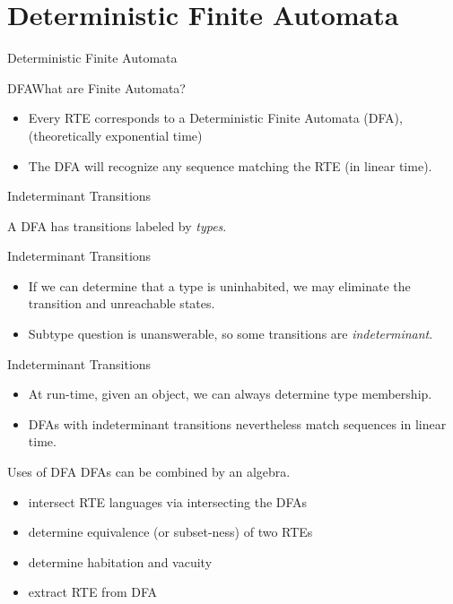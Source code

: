 \section{Deterministic Finite Automata}

\begin{frame}{Deterministic Finite Automata}
\end{frame}


\begin{frame}{DFA}{What are Finite Automata?}
  \begin{itemize}
  \item   Every RTE corresponds to a Deterministic Finite Automata (DFA),  (theoretically exponential time)

  \item   The DFA will recognize any sequence matching the RTE (in linear time).

  \end{itemize}
\end{frame}

\begin{frame}{Indeterminant Transitions}

  \scalebox{0.7}{}

   A DFA has transitions labeled by \emph{types}.
\end{frame}

\begin{frame}{Indeterminant Transitions}

  \scalebox{0.8}{}
  \begin{itemize}

  \item If we can determine that a type is uninhabited, we may eliminate the
  transition and unreachable states.

  \item Subtype question is unanswerable, so some transitions are \emph{indeterminant}.
  \end{itemize}
\end{frame}


\begin{frame}{Indeterminant Transitions}

  \scalebox{0.8}{}
  \begin{itemize}

    \item At run-time, given an object, we can always determine type membership.

    \item DFAs with indeterminant transitions nevertheless match sequences in linear time.  
  \end{itemize}
\end{frame}


\begin{frame}{Uses of DFA}
  DFAs can be combined by an algebra.

  \begin{itemize}
  \item intersect RTE languages via intersecting the DFAs
  \item determine equivalence (or subset-ness) of two RTEs
  \item determine habitation and vacuity
  \item extract RTE from DFA
  \end{itemize}
\end{frame}
